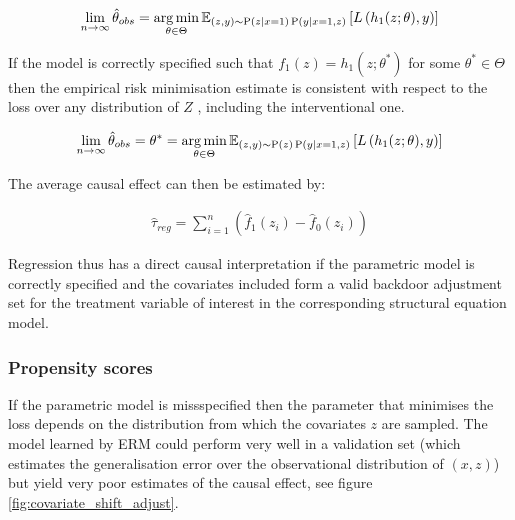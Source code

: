 \documentclass[11pt,a4paper,twoside]{report}
\newcommand{\Esub}[2]{\mathbb E_{#1}\left[{#2}\right]}
\newcommand{\argmin}{\operatornamewithlimits{arg\,min}}
\newcommand{\eqn}[1]{\begin{align}#1\end{align}}
\renewcommand{\P}[1]{\operatorname{P}\left(#1\right)}
\theoremstyle{plain}
\theoremstyle{definition}
\begin{document}
\eqn{
\lim_{n \rightarrow \infty}\hat{\theta}_{obs} = \argmin_{\theta \in \Theta} \Esub{(z,y) \sim \P{z|x=1}\P{y|x=1,z}}{L\left(h_1(z;\theta),y \right)}
}

If the model is correctly specified such that $f_1(z) = h_1(z;\theta^*)$ for some  $\theta^* \in \Theta$ then the empirical risk minimisation estimate is consistent with respect to the loss over any distribution of $Z$  \citep{Sugiyama2007}, including the interventional one. 

\eqn{
\lim_{n \rightarrow \infty}\hat{\theta}_{obs} = \theta^* = \argmin_{\theta \in \Theta} \Esub{(z,y) \sim \P{z}\P{y|x=1,z}}{L\left(h_1(z;\theta),y \right)}
}

The average causal effect can then be estimated by:

\eqn{
\label{eqn:cef_empirical_regression}
\hat{\tau}_{reg} = \sum_{i=1}^n \left(\hat{f}_1(z_i) - \hat{f}_0(z_i)\right)
}

Regression thus has a direct causal interpretation if the parametric model is correctly specified and the covariates included form a valid backdoor adjustment set for the treatment variable of interest in the corresponding structural equation model. 

\subsubsection{Propensity scores}
If the parametric model is missspecified then the parameter that minimises the loss depends on the distribution from which the covariates $z$ are sampled. The model learned by ERM could perform very well in a validation set (which estimates the generalisation error over the observational distribution of $(x,z)$) but yield very poor estimates of the causal effect, see figure \ref{fig:covariate_shift_adjust}. 
\end{document}
